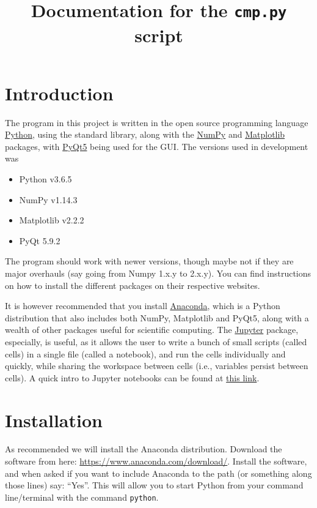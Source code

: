 \documentclass[a4paper,11pt]{article}
\title{Documentation for the \texorpdfstring{\texttt{cmp.py}}{cmp.py} script}
\date{}
\numberwithin{equation}{section}
\begin{document}
	\maketitle
	
	\section{Introduction}
	The program in this project is written in the open source programming language \href{www.python.org}{Python}, using the standard library, along with the \href{www.numpy.org}{NumPy} and \href{www.matplotlib.org}{Matplotlib} packages, with \href{www.pypi.org/project/PyQt5/}{PyQt5} being used for the GUI. The versions used in development was
	\begin{itemize}
		\item Python v3.6.5
		\item NumPy v1.14.3
		\item Matplotlib v2.2.2
		\item PyQt 5.9.2
	\end{itemize}
	The program should work with newer versions, though maybe not if they are major overhauls (say going from Numpy 1.x.y to 2.x.y). You can find instructions on how to install the different packages on their respective websites.
	
	It is however recommended that you install \href{https://www.anaconda.com/}{Anaconda}, which is a Python distribution that also includes both NumPy, Matplotlib and PyQt5, along with a wealth of other packages useful for scientific computing. The \href{http://jupyter.org/}{Jupyter} package, especially, is useful, as it allows the user to write a bunch of small scripts (called cells) in a single file (called a notebook), and run the cells individually and quickly, while sharing the workspace between cells (i.e., variables persist between cells). A quick intro to Jupyter notebooks can be found at \href{http://nbviewer.jupyter.org/github/jupyter/notebook/blob/master/docs/source/examples/Notebook/Notebook Basics.ipynb}{this link}.
	
	\section{Installation}
	As recommended we will install the Anaconda distribution. Download the software from here: \url{https://www.anaconda.com/download/}. Install the software, and when asked if you want to include Anaconda to the path (or something along those lines) say: ``Yes''. This will allow you to start Python from your command line/terminal with the command \texttt{python}.
	
\end{document}
